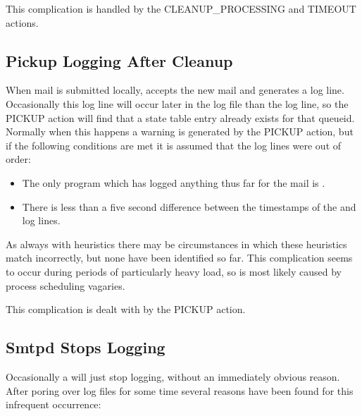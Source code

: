 This complication is handled by the CLEANUP\_PROCESSING and TIMEOUT
actions.

\subsection{Pickup Logging After Cleanup}

\label{pickup logging after cleanup}

When mail is submitted locally,  accepts the new mail and
generates a log line.  Occasionally this log line will occur later in the
log file than the  log line, so the PICKUP action will find
that a state table entry already exists for that queueid.  Normally when
this happens a warning is generated by the PICKUP action, but if the
following conditions are met it is assumed that the log lines were out of
order:

\begin{itemize}

    \item The only program which has logged anything thus far for the mail
        is .

    \item There is less than a five second difference between the
        timestamps of the  and  log lines.

\end{itemize}

As always with heuristics there may be circumstances in which these
heuristics match incorrectly, but none have been identified so far.  This
complication seems to occur during periods of particularly heavy load, so
is most likely caused by process scheduling vagaries.

This complication is dealt with by the PICKUP action.

\subsection{Smtpd Stops Logging}

\label{smtpd stops logging}

Occasionally a  will just stop logging, without an
immediately obvious reason.  After poring over log files for some time
several reasons have been found for this infrequent occurrence:

